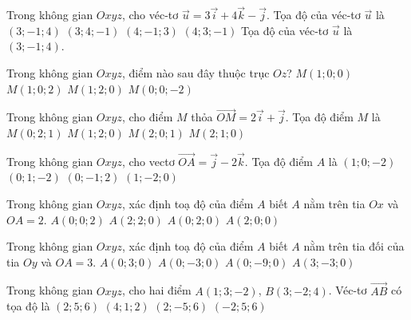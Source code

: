 \begin{ex}
	Trong không gian $Oxyz$, cho véc-tơ $\overrightarrow{u}=3\overrightarrow{i}+4\overrightarrow{k}-\overrightarrow{j}$. Tọa độ của véc-tơ $\overrightarrow{u}$ là
	\choice
	{\True $(3;-1;4)$}
	{$(3;4;-1)$}
	{$(4;-1;3)$}
	{$(4;3;-1)$}
	\loigiai
	{
		Tọa độ của véc-tơ $\overrightarrow{u}$ là $(3;-1;4)$.
	}
\end{ex} 

\begin{ex}
	Trong không gian $Oxyz$, điểm nào sau đây thuộc trục $Oz$?
	\choice
	{$M(1;0;0)$}
	{$M(1;0;2)$}
	{$M(1;2;0)$}
	{\True $M(0;0;-2)$}
\end{ex} 

\begin{ex}%
	Trong không gian $Oxyz$, cho điểm $M$ thỏa $\vec{OM} = 2\vec{i} + \vec{j}$. Tọa độ điểm $M$ là
	\choice
	{$M(0;2;1)$}
	{$M(1;2;0)$}
	{$M(2;0;1)$}
	{\True$M(2;1;0)$}
\end{ex} 

\begin{ex}%
	Trong không gian $Oxyz$, cho vectơ $\overrightarrow{OA}=\overrightarrow{j}-2\overrightarrow{k}$. Tọa độ điểm $A$ là
	\choice
	{$(1;0;-2)$}
	{\True $(0;1;-2)$}
	{$(0;-1;2)$}
	{$(1;-2;0)$}
\end{ex} 

\begin{ex}
	Trong không gian $O x y z$, xác định toạ độ của điểm $A$ biết $A$ nằm trên tia $O x$ và $O A=2$.
	\choice
	{$A(0;0;2)$}
	{$A(2;2;0)$}
	{$A(0;2;0)$}
	{\True $A(2;0;0)$}
\end{ex} 

\begin{ex}
	Trong không gian $O x y z$, xác định toạ độ của điểm $A$ biết $A$ nằm trên tia đối của tia $O y$ và $O A=3$.
	\choice
	{$A(0;3;0)$}
	{\True $A(0;-3;0)$}
	{$A(0;-9;0)$}
	{$A(3;-3;0)$}
\end{ex} 

\begin{ex}
	Trong không gian $ Oxyz $, cho hai điểm $ A(1;3;-2) $, $ B(3;-2;4) $. Véc-tơ $ \overrightarrow{AB} $ có tọa độ là
	\choice
	{\True $ (2;5;6) $}
	{$ (4;1;2) $}
	{\True $ (2;-5;6) $}
	{$ (-2;5;6) $}
\end{ex} 

